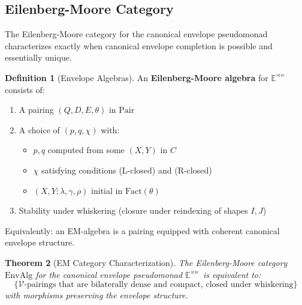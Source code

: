 \documentclass[11pt]{article}
\theoremstyle{plain}
\newtheorem{theorem}{Theorem}[section]
\theoremstyle{definition}
\newtheorem{definition}[theorem]{Definition}
\theoremstyle{remark}
\newcommand{\V}{\mathcal{V}}
\newcommand{\Fact}{\mathrm{Fact}}
\newcommand{\Pair}{\mathrm{Pair}}
\newcommand{\EnvAlg}{\mathrm{EnvAlg}}
\begin{document}
\subsection{Eilenberg-Moore Category}

The Eilenberg-Moore category for the canonical envelope pseudomonad characterizes exactly when canonical envelope completion is possible and essentially unique.

\begin{definition}[Envelope Algebras]
An \textbf{Eilenberg-Moore algebra} for $\mathbb{E}^{\rtimes \ltimes}$ consists of:

\begin{enumerate}
\item A pairing $(Q, D, E, \theta)$ in $\Pair$
\item A choice of $(p, q, \chi)$ with:
\begin{itemize}
\item $p, q$ computed from some $(X, Y)$ in $C$
\item $\chi$ satisfying conditions (L-closed) and (R-closed)  
\item $(X, Y; \lambda, \gamma, \rho)$ initial in $\Fact(\theta)$
\end{itemize}
\item Stability under whiskering (closure under reindexing of shapes $I, J$)
\end{enumerate}

Equivalently: an EM-algebra is a pairing equipped with coherent canonical envelope structure.
\end{definition}

\begin{theorem}[EM Category Characterization]
The Eilenberg-Moore category $\EnvAlg$ for the canonical envelope pseudomonad $\mathbb{E}^{\rtimes \ltimes}$ is equivalent to:
$$
\{\text{$\V$-pairings that are bilaterally dense and compact, closed under whiskering}\}
$$
with morphisms preserving the envelope structure.
\end{theorem}
\end{document}
